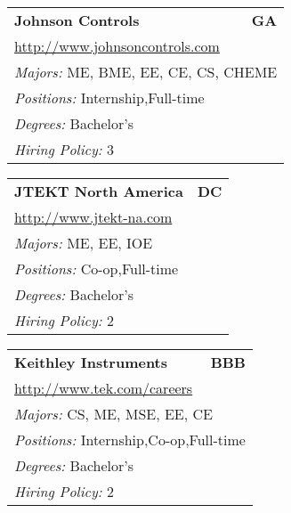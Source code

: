 \documentclass[twoside]{article}
\begin{document}
\begin{center}
\begin{multicols}{3}
\begin{FlushLeft}
\begin{minipage}{.9\columnwidth}
\end{minipage}
 
\begin{minipage}{.9\columnwidth}\begin{tabularx}{.95\columnwidth}{Xr}
                 {\Large\bf Johnson Controls} & {\Large\bf GA}\\
    \multicolumn{2}{p{.95\columnwidth}}{\url{http://www.johnsoncontrols.com}}\\
    \multicolumn{2}{p{.95\columnwidth}}{\emph{Majors:} ME, BME, EE, CE, CS, CHEME}\\
    \multicolumn{2}{p{.95\columnwidth}}{\emph{Positions:} Internship,Full-time}\\
    \multicolumn{2}{p{.95\columnwidth}}{\emph{Degrees:} Bachelor's}\\
    \multicolumn{2}{p{.95\columnwidth}}{\emph{Hiring Policy:} 3}\\
    \end{tabularx}
    
\end{minipage}
 
\begin{minipage}{.9\columnwidth}\begin{tabularx}{.95\columnwidth}{Xr}
                 {\Large\bf JTEKT North America} & {\Large\bf DC}\\
    \multicolumn{2}{p{.95\columnwidth}}{\url{http://www.jtekt-na.com}}\\
    \multicolumn{2}{p{.95\columnwidth}}{\emph{Majors:} ME, EE, IOE}\\
    \multicolumn{2}{p{.95\columnwidth}}{\emph{Positions:} Co-op,Full-time}\\
    \multicolumn{2}{p{.95\columnwidth}}{\emph{Degrees:} Bachelor's}\\
    \multicolumn{2}{p{.95\columnwidth}}{\emph{Hiring Policy:} 2}\\
    \end{tabularx}
    
\end{minipage}
 
\begin{minipage}{.9\columnwidth}\begin{tabularx}{.95\columnwidth}{Xr}
                 {\Large\bf Keithley Instruments} & {\Large\bf BBB}\\
    \multicolumn{2}{p{.95\columnwidth}}{\url{http://www.tek.com/careers}}\\
    \multicolumn{2}{p{.95\columnwidth}}{\emph{Majors:} CS, ME, MSE, EE, CE}\\
    \multicolumn{2}{p{.95\columnwidth}}{\emph{Positions:} Internship,Co-op,Full-time}\\
    \multicolumn{2}{p{.95\columnwidth}}{\emph{Degrees:} Bachelor's}\\
    \multicolumn{2}{p{.95\columnwidth}}{\emph{Hiring Policy:} 2}\\
    \end{tabularx}
    

\end{minipage}
\end{FlushLeft}
\end{multicols}
\end{center}
\end{document}
